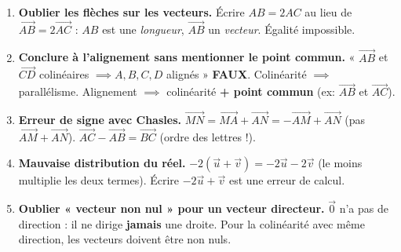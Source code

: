 \documentclass[11pt]{article}
\begin{document}
\begin{attention}
\begin{enumerate}
\item \textbf{Oublier les flèches sur les vecteurs.} Écrire $AB = 2AC$ au lieu de $\overrightarrow{AB} = 2\overrightarrow{AC}$ : $AB$ est une \emph{longueur}, $\overrightarrow{AB}$ un \emph{vecteur}. Égalité impossible.
\item \textbf{Conclure à l'alignement sans mentionner le point commun.} « $\overrightarrow{AB}$ et $\overrightarrow{CD}$ colinéaires $\implies A,B,C,D$ alignés » \textbf{FAUX}. Colinéarité $\implies$ parallélisme. Alignement $\implies$ colinéarité \textbf{+ point commun} (ex: $\overrightarrow{AB}$ et $\overrightarrow{AC}$).
\item \textbf{Erreur de signe avec Chasles.} $\overrightarrow{MN} = \overrightarrow{MA} + \overrightarrow{AN} = -\overrightarrow{AM} + \overrightarrow{AN}$ (pas $\overrightarrow{AM}+\overrightarrow{AN}$). $\overrightarrow{AC} - \overrightarrow{AB} = \overrightarrow{BC}$ (ordre des lettres !).
\item \textbf{Mauvaise distribution du réel.} $-2(\vec{u}+\vec{v}) = -2\vec{u} - 2\vec{v}$ (le moins multiplie les deux termes). Écrire $-2\vec{u} + \vec{v}$ est une erreur de calcul.
\item \textbf{Oublier « vecteur non nul » pour un vecteur directeur.} $\vec{0}$ n'a pas de direction : il ne dirige \textbf{jamais} une droite. Pour la colinéarité avec même direction, les vecteurs doivent être non nuls.
\end{enumerate}
\end{attention}
\end{document}
